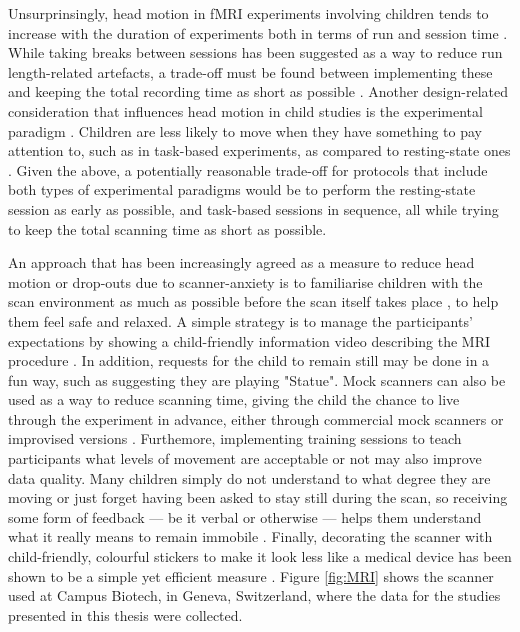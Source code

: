 Unsurprinsingly, head motion in fMRI experiments involving children tends to increase with the duration of experiments both in terms of run and session time \citep{Engelhardt2017}. While taking breaks between sessions has been suggested as a way to reduce run length-related artefacts, a trade-off must be found between implementing these and keeping the total recording time as short as possible \citep{Meissner2019}.  Another design-related consideration that influences head motion in child studies is the experimental paradigm \citep{Yuan2009a}. Children are less likely to move when they have something to pay attention to, such as in task-based experiments, as compared to resting-state ones \citep{Engelhardt2017}. Given the above, a potentially reasonable trade-off for protocols that include both types of experimental paradigms would be to perform the resting-state session as early as possible, and task-based sessions in sequence, all while trying to keep the total scanning time as short as possible. 


An approach that has been increasingly agreed as a measure to reduce head motion or drop-outs due to scanner-anxiety is to familiarise children with the scan environment as much as possible before the scan itself takes place \citep{Greene2016}, to help them feel safe and relaxed. A simple strategy is to manage the participants' expectations by showing a child-friendly information video describing the MRI procedure \citep{Thomason2009}. In addition, requests for the child to remain still may be done in a fun way, such as suggesting they are playing "Statue". Mock scanners can also be used as a way to reduce scanning time, giving the child the chance to live through the experiment in advance, either through commercial mock scanners or improvised versions \citep{DeBie2010,Barnea-Goraly2014}. Furthemore, implementing training sessions to teach participants what levels of movement are acceptable or not may also improve data quality. Many children simply do not understand to what degree they are moving or just forget having been asked to stay still during the scan, so receiving some form of feedback --- be it verbal or otherwise --- helps them understand what it really means to remain immobile \citep{DeBie2010}. Finally, decorating the scanner with child-friendly, colourful stickers to make it look less like a medical device has been shown to be a simple yet efficient measure \citep{Nordahl2016}. Figure \ref{fig:MRI} shows the scanner used at Campus Biotech, in Geneva, Switzerland, where the data for the studies presented in this thesis were collected.



